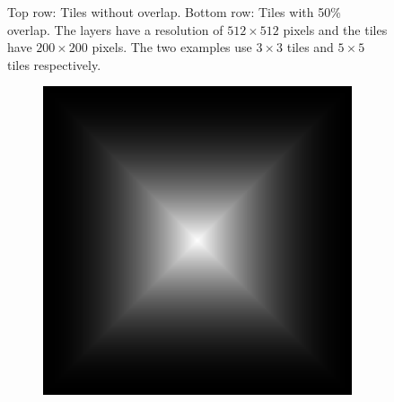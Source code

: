 \documentclass[11pt,a4paper,titlepage]{article}
\begin{document}
\begin{figure}
	\caption{Top row: Tiles without overlap. Bottom row: Tiles with 50\% overlap. The layers have a resolution of $512 \times 512$ pixels and the tiles have $200 \times 200$ pixels. The two examples use $3 \times 3$ tiles and $5 \times 5$ tiles respectively.}
	\label{fig:comparison_tile_overlap_vs_no_overlap}
\end{figure}

\begin{figure}
	\centering
	\begin{subfigure}[t]{0.30\textwidth}
		\includegraphics[width=\textwidth]{results/tile_blending/quadratic_tile_blending_mask.png}
		\caption{}
		\label{fig:quadratic_blending_mask}
	\end{subfigure}%
	~\quad
	\begin{subfigure}[t]{0.30\textwidth}

\end{subfigure}
\end{figure}
\end{document}
